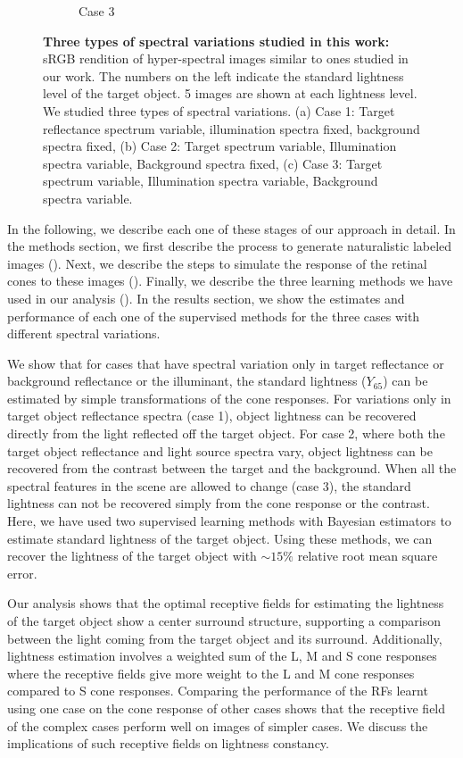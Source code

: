 \documentclass{jov}
\begin{document}
\begin{figure}
\begin{subfigure}[b]{0.33 \textwidth}
        \caption{Case 3}
        \label{fig:allSpectraVarying}
    \end{subfigure}    
    \caption{{\bf Three types of spectral variations studied in this work:} sRGB rendition of hyper-spectral images similar to ones studied in our work. The numbers on the left indicate the standard lightness level of the target object. 5 images are shown at each lightness level. We studied three types of spectral variations. (a) Case 1: Target reflectance spectrum variable, illumination spectra fixed, background spectra fixed, (b) Case 2: Target spectrum variable, Illumination spectra variable, Background spectra fixed, (c) Case 3: Target spectrum variable, Illumination spectra variable, Background spectra variable.}
\label{fig:studiedCases}
\end{figure}

In the following, we describe each one of these stages of our approach in detail. In the methods section, we first describe the process to generate naturalistic labeled images (). Next, we describe the steps to simulate the response of the retinal cones to these images (). Finally, we describe the three learning methods we have used in our analysis (). In the results section, we show the estimates and performance of each one of the supervised methods for the three cases with different spectral variations. 

We show that for cases that have spectral variation only in target reflectance or background reflectance or the illuminant, the standard lightness ($Y_{65}$) can be estimated by simple transformations of the cone responses. For variations only in target object reflectance spectra (case 1), object lightness can be recovered directly from the light reflected off the target object. For case 2, where both the target object reflectance and light source spectra vary, object lightness can be recovered from the contrast between the target and the background. When all the spectral features in the scene are allowed to change (case 3), the standard lightness can not be recovered simply from the cone response or the contrast. Here, we have used two supervised learning methods with Bayesian estimators to estimate standard lightness of the target object. Using these methods, we can recover the lightness of the target object with $\sim 15\%$ relative root mean square error. 

Our analysis shows that the optimal receptive fields for estimating the lightness of the target object show a center surround structure, supporting a comparison between the light coming from the target object and its surround. Additionally, lightness estimation involves a weighted sum of the L, M and S cone responses where the receptive fields give more weight to the L and M cone responses compared to S cone responses. Comparing the performance of the RFs learnt using  one case on the cone response of other cases shows that the receptive field of the complex cases perform well on images of simpler cases. We discuss the implications of such receptive fields on lightness constancy. 
\end{document}
